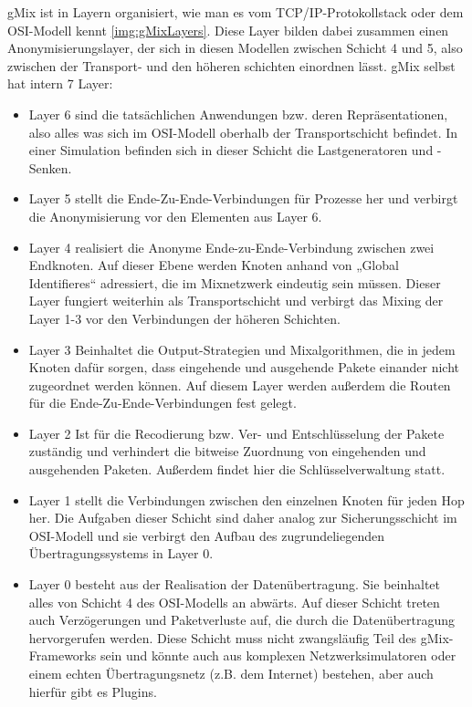 \documentclass[a4paper, 11pt]{article} %
\begin{document}
gMix ist in Layern organisiert, wie man es vom TCP/IP-Protokollstack oder dem OSI-Modell kennt \ref{img:gMixLayers}. Diese Layer bilden dabei zusammen einen Anonymisierungslayer, der sich in diesen Modellen zwischen Schicht 4 und 5, also zwischen der Transport- und den höheren schichten einordnen lässt. gMix selbst hat intern 7 Layer:
\begin{itemize}
	\item Layer 6 sind die tatsächlichen Anwendungen bzw. deren Repräsentationen, also alles was sich im OSI-Modell oberhalb der Transportschicht befindet. In einer Simulation befinden sich in dieser Schicht die Lastgeneratoren und -Senken.
	\item Layer 5 stellt die Ende-Zu-Ende-Verbindungen für Prozesse her und verbirgt die Anonymisierung vor den Elementen aus Layer 6.
	\item Layer 4 realisiert die Anonyme Ende-zu-Ende-Verbindung zwischen zwei Endknoten. Auf dieser Ebene werden Knoten anhand von „Global Identifieres“ adressiert, die im Mixnetzwerk eindeutig sein müssen. Dieser Layer fungiert weiterhin als Transportschicht und verbirgt das Mixing der Layer 1-3 vor den Verbindungen der höheren Schichten.
	\item Layer 3 Beinhaltet die Output-Strategien und Mixalgorithmen, die in jedem Knoten dafür sorgen, dass eingehende und ausgehende Pakete einander nicht zugeordnet werden können. Auf diesem Layer werden außerdem die Routen für die Ende-Zu-Ende-Verbindungen fest gelegt.
	\item Layer 2 Ist für die Recodierung bzw. Ver- und Entschlüsselung der Pakete zuständig und verhindert die bitweise Zuordnung von eingehenden und ausgehenden Paketen. Außerdem findet hier die Schlüsselverwaltung statt.
	\item Layer 1 stellt die Verbindungen zwischen den einzelnen Knoten für jeden Hop her. Die Aufgaben dieser Schicht sind daher analog zur Sicherungsschicht im OSI-Modell und sie verbirgt den Aufbau des zugrundeliegenden Übertragungssystems in Layer 0.
	\item Layer 0 besteht aus der Realisation der Datenübertragung. Sie beinhaltet alles von Schicht 4 des OSI-Modells an abwärts. Auf dieser Schicht treten auch Verzögerungen und Paketverluste auf, die durch die Datenübertragung hervorgerufen werden. Diese Schicht muss nicht zwangsläufig Teil des gMix-Frameworks sein und könnte auch aus komplexen Netzwerksimulatoren oder einem echten Übertragungsnetz (z.B. dem Internet) bestehen, aber auch hierfür gibt es Plugins.
\end{itemize}
\end{document}
